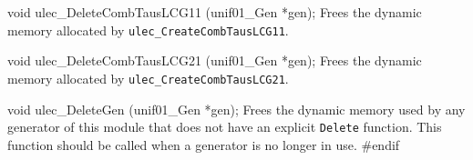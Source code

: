 

\code
void ulec_DeleteCombTausLCG11 (unif01_Gen *gen);
\endcode
  \tab Frees the dynamic memory allocated by
   {\tt ulec\_CreateCombTausLCG11}.
 \endtab
\code


void ulec_DeleteCombTausLCG21 (unif01_Gen *gen);
\endcode
  \tab Frees the dynamic memory allocated by
   {\tt ulec\_CreateCombTausLCG21}.
 \endtab
\code


void ulec_DeleteGen (unif01_Gen *gen);
\endcode
 \tab Frees the dynamic memory used by any generator of this module
  that does not have an explicit {\tt Delete} function.
  This function should be called when a generator
  is no longer in use.
 \endtab
\code
\hide
#endif
\endhide
\endcode


\iffalse  %
\bigskip
\hrule
\bigskip

{
See also
\bigskip

\setlength{\partopsep}{0pt}
\setlength{\parskip}{0pt}
\setlength{\topsep}{0pt}
\setlength{\itemsep}{0pt}

\begin{itemize}
\item {\tt utezu\_CreateTezLec91}
\end{itemize}
}
\fi  %

